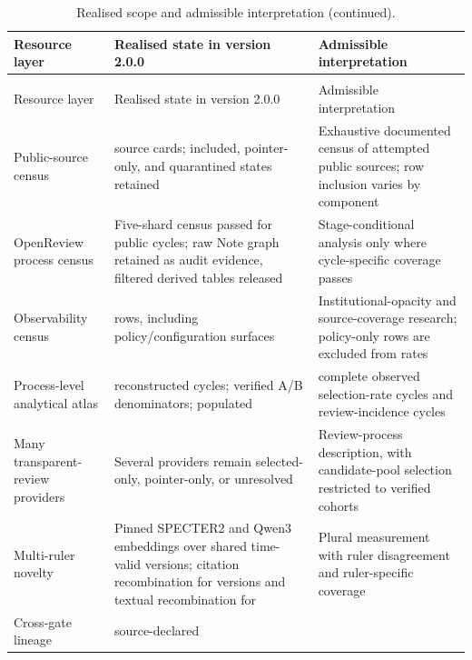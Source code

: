 \documentclass[
  10pt,
]{article}
\begin{document}
{\small
\begin{longtable}[]{@{}L{0.23\textwidth}L{0.39\textwidth}L{0.30\textwidth}@{}}
\caption{Realised scope and admissible interpretation.}\\
\toprule\noalign{}
Resource layer & Realised state in version 2.0.0 & Admissible
interpretation \\
\midrule\noalign{}
\endfirsthead
\caption[]{Realised scope and admissible interpretation (continued).}\\
\toprule\noalign{}
Resource layer & Realised state in version 2.0.0 & Admissible
interpretation \\
\midrule\noalign{}
\endhead
\bottomrule\noalign{}
\endlastfoot
Public-source census & \OSGClaimSourceCards{} source cards; included, pointer-only,
and quarantined states retained & Exhaustive documented census of
attempted public sources; row inclusion varies by component \\
OpenReview process census & Five-shard census passed
for \OSGClaimVerifiedOpenreviewCycles{} public cycles; raw Note graph retained as audit evidence,
filtered derived tables released & Stage-conditional analysis only where
cycle-specific coverage passes \\
Observability census & \OSGClaimObservabilityCensusCycles{} rows, including
\OSGClaimPolicySurfaceCycles{} policy/configuration surfaces & Institutional-opacity and source-coverage research; policy-only rows
are excluded from rates \\
Process-level analytical atlas & \OSGClaimPublicationGateCycles{}
reconstructed cycles; \OSGClaimAdmissibleRateCycles{} verified A/B
denominators; \OSGClaimPopulatedAdmissibleCycles{} populated &
\OSGClaimSelectionRateCycles{} complete observed selection-rate cycles and
\OSGClaimReviewRateCycles{} review-incidence cycles \\
Many transparent-review providers & Several providers remain
selected-only, pointer-only, or unresolved & Review-process description,
with candidate-pool selection restricted to verified cohorts \\
Multi-ruler novelty & Pinned SPECTER2 and Qwen3 embeddings over
\OSGClaimSemanticRulerSharedRows{} shared time-valid versions; citation
recombination for \OSGClaimRecombinatorialVersions{} versions and textual
recombination for \OSGClaimTextualRecombinatorialVersions{} & Plural measurement with ruler
disagreement and ruler-specific coverage \\
Cross-gate lineage & \OSGClaimSourceDeclaredLineageEdges{} source-declared

\end{longtable}}
\end{document}
